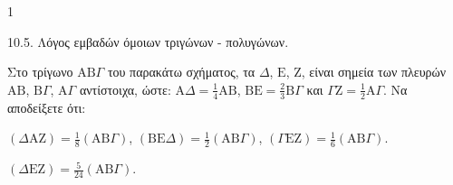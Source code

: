 \begin{ylh}{1}
    \item 10.5. Λόγος εμβαδών όμοιων τριγώνων - πολυγώνων.
\end{ylh}
\begin{figure}
\end{figure}
Στο τρίγωνο $\mathrm{A}\mathrm{B}\Gamma$ του παρακάτω σχήματος, τα $\Delta$, $\mathrm{E}$, $\mathrm{Z}$, είναι σημεία των πλευρών $\mathrm{A}\mathrm{B}$, $\mathrm{B}\Gamma$, $\mathrm{A}\Gamma$ αντίστοιχα, ώστε: $\mathrm{A}\Delta = \frac{1}{4}\mathrm{A}\mathrm{B}$, $\mathrm{B}\mathrm{E} = \frac{2}{3}\mathrm{B}\Gamma$ και $\Gamma\mathrm{Z} = \frac{1}{2}\mathrm{A}\Gamma$. Να αποδείξετε ότι:
\begin{alist}
\item $\left(\Delta\mathrm{A}\mathrm{Z}\right) = \frac{1}{8} \left(\mathrm{A}\mathrm{B}\Gamma\right)$, $\left(\mathrm{B}\mathrm{E}\Delta\right) = \frac{1}{2} \left(\mathrm{A}\mathrm{B}\Gamma\right)$, $\left(\Gamma\mathrm{E}\mathrm{Z}\right) = \frac{1}{6} \left(\mathrm{A}\mathrm{B}\Gamma\right)$. 
\item $\left(\Delta\mathrm{E}\mathrm{Z}\right) = \frac{5}{24} \left(\mathrm{A}\mathrm{B}\Gamma\right)$. 
\end{alist}